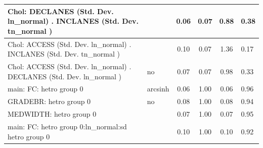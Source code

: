 \begin{table}
\begin{center}
\begin{tabular}{|l|l|c|c|c|l|}
			\hline
			 Chol: DECLANES (Std. Dev. ln_normal) . INCLANES (Std. Dev.   tn_normal ) &  & 0.06 & 0.07 & 0.88 & 0.38 \\
			\hline
			 Chol: ACCESS (Std. Dev. ln_normal) . INCLANES (Std. Dev.   tn_normal ) &  & 0.10 & 0.07 & 1.36 & 0.17 \\
			\hline
			 Chol: ACCESS (Std. Dev. ln_normal) . DECLANES (Std. Dev.   ln_normal ) & no & 0.07 & 0.07 & 0.98 & 0.33 \\
			\hline
			main: FC: hetro group 0 & arcsinh & 0.06 & 1.00 & 0.06 & 0.96 \\
			\hline
			GRADEBR: hetro group 0 & no & 0.08 & 1.00 & 0.08 & 0.94 \\
			\hline
			MEDWIDTH: hetro group 0 &  & 0.07 & 1.00 & 0.07 & 0.95 \\
			\hline
			main: FC: hetro group 0:ln_normal:sd  hetro group 0 &  & 0.10 & 1.00 & 0.10 & 0.92 \\
			\hline
		\end{tabular}
	\end{center}
\end{table}